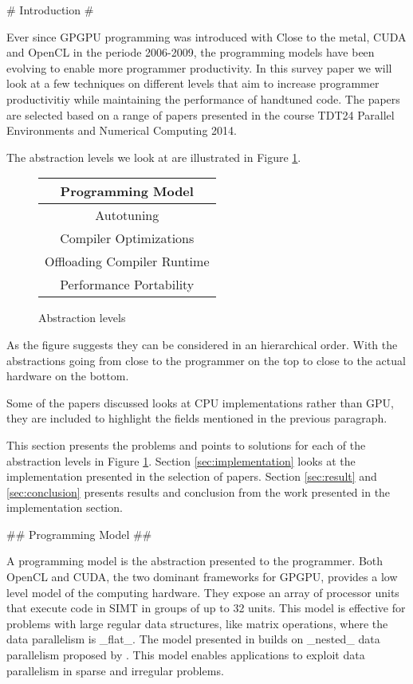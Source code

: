 \begin{markdown}

# Introduction #

Ever since GPGPU programming was introduced with Close to the metal,
CUDA\cite{CUDA} and OpenCL\cite{opencl} in the periode 2006-2009, the
programming models have been evolving to enable more programmer
productivity.  In this survey paper we will look at a few techniques
on different levels that aim to increase programmer productivitiy
while maintaining the performance of handtuned code. The papers are
selected based on a range of papers presented in the course TDT24
Parallel Environments and Numerical Computing 2014.

The abstraction levels we look at are illustrated in Figure
\ref{fig:abstraction}.

\begin{figure}[H]
  \centering
  \begin{tabular}{|c|}
    \hline
    Programming Model \\
    \hline \hline
    Autotuning \\
    \hline \hline
    Compiler Optimizations \\
    \hline \hline
    Offloading Compiler Runtime \\
    \hline \hline
    Performance Portability \\
    \hline
  \end{tabular}
  \caption{Abstraction levels}
  \label{fig:abstraction}
\end{figure}

As the figure suggests they can be considered in an hierarchical
order. With the abstractions going from close to the programmer on the
top to close to the actual hardware on the bottom. 

Some of the papers discussed looks at CPU implementations rather than
GPU, they are included to highlight the fields mentioned in the previous
paragraph.

This section presents the problems and points to solutions for each of
the abstraction levels in Figure \ref{fig:abstraction}. Section
\ref{sec:implementation} looks at the implementation presented in the
selection of papers. Section \ref{sec:result} and \ref{sec:conclusion}
presents results and conclusion from the work presented in the
implementation section. 

## Programming Model ##

A programming model is the abstraction presented to the programmer.
Both OpenCL and CUDA, the two dominant frameworks for GPGPU, provides
a low level model of the computing hardware. They expose an array of
processor units that execute code in SIMT in groups of up to 32
units. This model is effective for problems with large regular data
structures, like matrix operations, where the data parallelism is
_flat_. The model presented in \cite{data-para} builds on _nested_
data parallelism proposed by \cite{nesl}. This model enables
applications to exploit data parallelism in sparse and irregular
problems.


\end{markdown}
